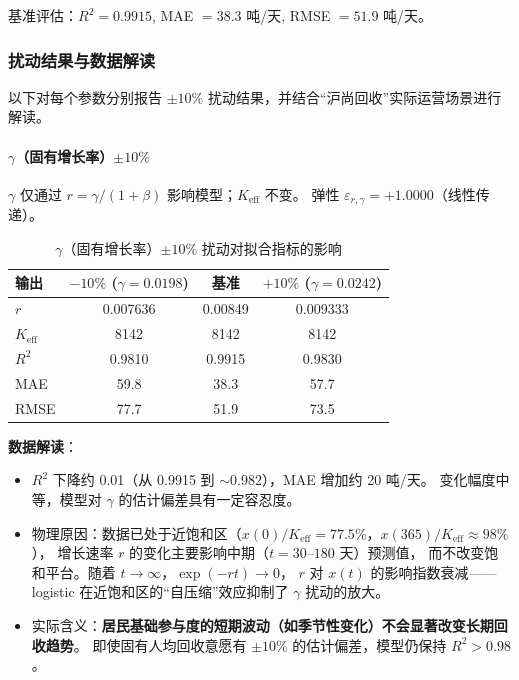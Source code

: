 \documentclass[12pt,a4paper]{ctexart}
\begin{document}
\begin{table}[htbp]
基准评估：$R^2 = 0.9915$, MAE $= 38.3$ 吨/天, RMSE $= 51.9$ 吨/天。

\subsubsection{扰动结果与数据解读}

以下对每个参数分别报告 $\pm 10\%$ 扰动结果，并结合``沪尚回收''实际运营场景进行解读。

\paragraph{$\gamma$（固有增长率）$\pm 10\%$}

$\gamma$ 仅通过 $r = \gamma/(1+\beta)$ 影响模型；$K_{\text{eff}}$ 不变。
弹性 $\varepsilon_{r,\gamma} = +1.0000$（线性传递）。

\begin{table}[htbp]
\centering
\caption{$\gamma$（固有增长率）$\pm 10\%$ 扰动对拟合指标的影响}
\label{tab:sens_gamma}
\begin{tabular}{lccc}
\toprule
输出 & $-10\%$ ($\gamma = 0.0198$) & 基准 & $+10\%$ ($\gamma = 0.0242$) \\
\midrule
$r$      & 0.007636 & 0.00849 & 0.009333 \\
$K_{\text{eff}}$ & 8142 & 8142 & 8142 \\
$R^2$    & 0.9810 & 0.9915 & 0.9830 \\
MAE      & 59.8 & 38.3 & 57.7 \\
RMSE     & 77.7 & 51.9 & 73.5 \\
\bottomrule
\end{tabular}
\end{table}

\textbf{数据解读}：
\begin{itemize}
  \item $R^2$ 下降约 0.01（从 0.9915 到 $\sim$0.982），MAE 增加约 20 吨/天。
        变化幅度中等，模型对 $\gamma$ 的估计偏差具有一定容忍度。
  \item 物理原因：数据已处于近饱和区（$x(0)/K_{\text{eff}} = 77.5\%$，$x(365)/K_{\text{eff}} \approx 98\%$），
        增长速率 $r$ 的变化主要影响中期（$t = 30$--$180$ 天）预测值，
        而不改变饱和平台。随着 $t \to \infty$，$\exp(-rt) \to 0$，
        $r$ 对 $x(t)$ 的影响指数衰减——logistic 在近饱和区的``自压缩''效应抑制了 $\gamma$ 扰动的放大。
  \item 实际含义：\textbf{居民基础参与度的短期波动（如季节性变化）不会显著改变长期回收趋势}。
        即使固有人均回收意愿有 $\pm 10\%$ 的估计偏差，模型仍保持 $R^2 > 0.98$。
\end{itemize}


\end{table}
\end{document}
